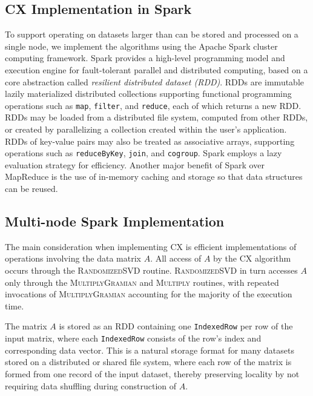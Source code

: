 
\subsection{CX Implementation in Spark}

To support operating on datasets larger than can be stored and processed on a single node,
we implement the algorithms using the Apache Spark cluster computing framework.
Spark provides a high-level programming model and execution engine for
fault-tolerant parallel and distributed computing, based on a core 
abstraction called \textit{resilient distributed dataset (RDD)}.
RDDs are immutable lazily materialized distributed collections supporting functional
programming operations such as \texttt{map}, \texttt{filter}, and \texttt{reduce},
each of which returns a new RDD.
RDDs may be loaded from a distributed file system, computed from other RDDs,
or created by parallelizing a collection created within the user's application.
RDDs of key-value pairs may also be treated as associative arrays, supporting
operations such as \texttt{reduceByKey}, \texttt{join}, and \texttt{cogroup}.
Spark employs a lazy evaluation strategy for efficiency.
Another major benefit of Spark over MapReduce is the use of in-memory caching and storage so that data structures
can be reused. %

\subsection{Multi-node Spark Implementation}
\label{sec:cx_spark}
The main consideration when implementing CX %
is
efficient implementations of operations involving the data matrix $A$.
All access of $A$ by the CX algorithm occurs through the
\textsc{RandomizedSVD} routine.
\textsc{RandomizedSVD} in turn accesses $A$ only through the \textsc{MultiplyGramian} and
\textsc{Multiply} routines, with repeated invocations of \textsc{MultiplyGramian}
accounting for the majority of the %
execution time.

The matrix $A$ is stored as an RDD containing one \texttt{IndexedRow} per row of the input matrix,
where each \texttt{IndexedRow} consists of the row's index and corresponding data vector.
This is a natural storage format for many datasets stored on a distributed or shared file
system, where each row of the matrix is formed from one record of the
input dataset, thereby preserving locality by not requiring data shuffling
during construction of $A$.


